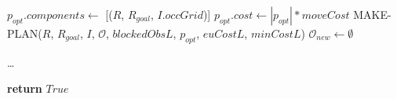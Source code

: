 \begin{algorithm}[H]
\begin{algorithmic}[1]
          \State $p_{opt}.components \gets$ [($R$, $R_{goal}$, $I.occGrid$)]
          \State $p_{opt}.cost \gets |p_{opt}| * moveCost$
          \State MAKE-PLAN($R$, $R_{goal}$, $I$, $\mathcal{O}$, $blockedObsL$, $p_{opt}$, $euCostL$, $minCostL$)
          \State $\mathcal{O}_{new} \gets \emptyset$
        \EndIf

        \State \dots {}

      \EndWhile

      \State \textbf{return} $True$

    \EndProcedure

  \end{algorithmic}
\end{algorithm}
